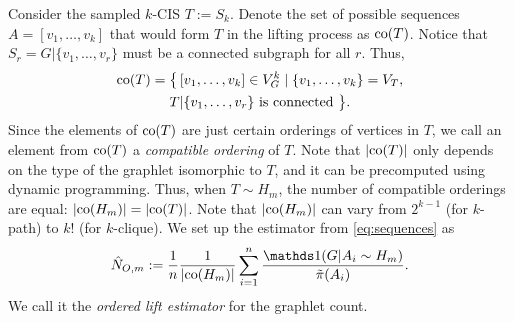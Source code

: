 	Consider the sampled $k$-CIS $T := S_k$.
	Denote the set of possible sequences $A = [v_1,\ldots, v_k]$ that would form $T$ in the lifting process as $\mathrm{co}(T)$.
	Notice that $S_r = G|\{v_1,\ldots,v_r\}$ must be a connected subgraph for all $r$.
	Thus,
	\begin{multline}
	\label{eq:co}
	    \mathrm{co}(T) = \big\{\,[v_1,\ldots,v_k]\in V^k_G \mid \{v_1,\ldots,v_k\} = V_T,\\  T|\{v_1,\ldots,v_r\} \text{ is connected }\big\}.
	\end{multline}
	Since the elements of $\mathrm{co}(T)$ are just certain orderings of vertices in $T$, we call an element from $\mathrm{co}(T)$ a \textit{compatible ordering} of $T$.
	Note that $|\mathrm{co}(T)|$ only depends on the type of the graphlet isomorphic to $T$, and it can be precomputed using dynamic programming.
	Thus, when $T\sim H_m$, the number of compatible orderings are equal: $|\mathrm{co}(H_m)| = |\mathrm{co}(T)|$. Note that $|\mathrm{co}(H_m)|$ can vary from $2^{k-1}$ (for $k$-path) to $k!$ (for $k$-clique).
	We set up the estimator from \eqref{eq:sequences} as
	\begin{equation}
	\label{eq:ord_est}
	    \hat N_{O,m} := \frac{1}{n}\frac{1}{|\co(H_m)|} \sum_{i=1}^n \frac{\ind(G|A_i\sim H_m)}{\tilde\pi(A_i)}.
	\end{equation}
	We call it the {\em ordered lift estimator} for the graphlet count.

